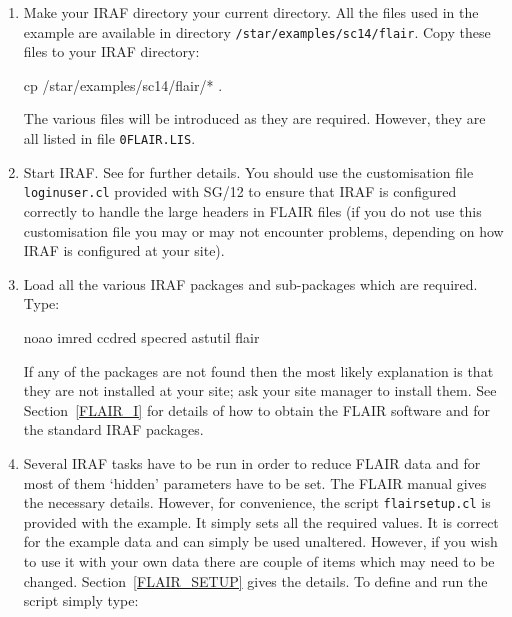 \documentclass[chapters,twoside,11pt]{starlink}
\begin{document}
\begin{enumerate}

  \item Make your IRAF directory your current directory.  All
   the files used in the example are available in directory
   \texttt{/star/examples/sc14/flair}.  Copy these files to your
   IRAF directory:

\begin{terminalv}
cp  /star/examples/sc14/flair/* .
\end{terminalv}

   The various files will be introduced as they are required.
   However, they are all listed in file \texttt{0FLAIR.LIS}.

  \item Start IRAF.  See  for further
   details.  You should use the customisation file \texttt{\newline
   loginuser.cl} provided with SG/12 to ensure that IRAF
   is configured correctly to handle the large headers in
   FLAIR files (if you do not use this customisation file you
   may or may not encounter problems, depending on how IRAF is
   configured at your site).

  \item Load all the various IRAF packages and sub-packages
   which are required.  Type:

\begin{terminalv}
noao
imred
ccdred
specred
astutil
flair
\end{terminalv}

   If any of the packages are not found then the most likely
   explanation is that they are not installed at your site;
   ask your site manager to install them.  See Section~\ref{FLAIR_I}
   for details of how to obtain the FLAIR software and
    for the standard IRAF packages.

  \item Several IRAF tasks have to be run in order to reduce
   FLAIR data and for most of them `hidden' parameters have
   to be set.  The FLAIR manual\cite{DRINK96} gives the
   necessary details.  However, for convenience, the script \texttt{flairsetup.cl} is provided with the example.  It simply sets
   all the required values.  It is correct for the example
   data and can simply be used unaltered.  However, if you wish
   to use it with your own data there are couple of items which
   may need to be changed.  Section~\ref{FLAIR_SETUP} gives the
   details.  To define and run the script simply type:


\end{enumerate}
\end{document}

